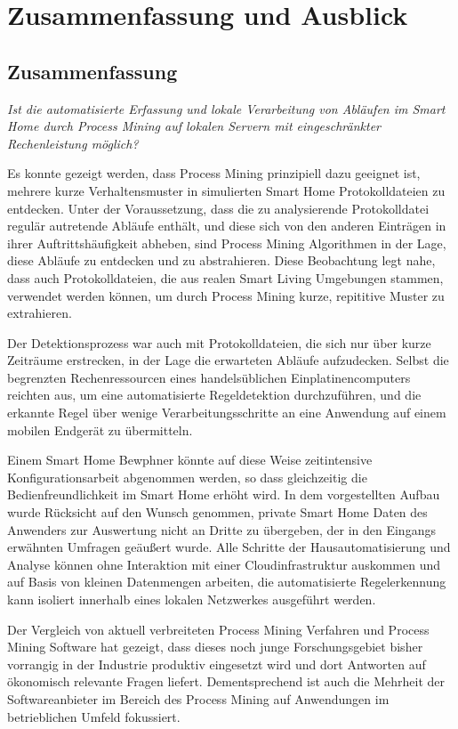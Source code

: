 \chapter{Zusammenfassung und Ausblick}
\section{Zusammenfassung}
\vspace{5mm}
\textsl{Ist die automatisierte Erfassung und lokale Verarbeitung von Abläufen im Smart Home durch Process Mining auf lokalen Servern mit eingeschränkter Rechenleistung möglich?}
\vspace{5mm}

Es konnte gezeigt werden, dass Process Mining prinzipiell dazu geeignet ist, mehrere kurze Verhaltensmuster in simulierten Smart Home Protokolldateien zu entdecken. Unter der Voraussetzung, dass die zu analysierende Protokolldatei regulär autretende Abläufe enthält, und diese sich von den anderen Einträgen in ihrer Auftrittshäufigkeit abheben, sind Process Mining Algorithmen in der Lage, diese Abläufe zu entdecken und zu abstrahieren. Diese Beobachtung legt nahe, dass auch Protokolldateien, die aus realen Smart Living Umgebungen stammen, verwendet werden können, um durch Process Mining kurze, repititive Muster zu extrahieren. 

Der Detektionsprozess war auch mit Protokolldateien, die sich nur über kurze Zeiträume erstrecken, in der Lage die erwarteten Abläufe aufzudecken. Selbst die begrenzten Rechenressourcen eines handelsüblichen Einplatinencomputers reichten aus, um eine automatisierte Regeldetektion durchzuführen, und die erkannte Regel über wenige Verarbeitungsschritte an eine Anwendung auf einem mobilen Endgerät zu übermitteln.

Einem Smart Home Bewphner könnte auf diese Weise zeitintensive Konfigurationsarbeit abgenommen werden, so dass gleichzeitig die Bedienfreundlichkeit im Smart Home erhöht wird. In dem vorgestellten Aufbau wurde Rücksicht auf den Wunsch genommen, private Smart Home Daten des Anwenders zur Auswertung nicht an Dritte zu übergeben, der in den Eingangs erwähnten Umfragen geäußert wurde. Alle Schritte der Hausautomatisierung und Analyse können ohne Interaktion mit einer Cloudinfrastruktur auskommen und auf Basis von kleinen Datenmengen arbeiten, die automatisierte Regelerkennung kann isoliert innerhalb eines lokalen Netzwerkes ausgeführt werden.

Der Vergleich von aktuell verbreiteten Process Mining Verfahren und Process Mining Software hat gezeigt, dass dieses noch junge Forschungsgebiet bisher vorrangig in der Industrie produktiv eingesetzt wird und dort Antworten auf ökonomisch relevante Fragen liefert. Dementsprechend ist auch die Mehrheit der Softwareanbieter im Bereich des Process Mining auf Anwendungen im betrieblichen Umfeld fokussiert. 


